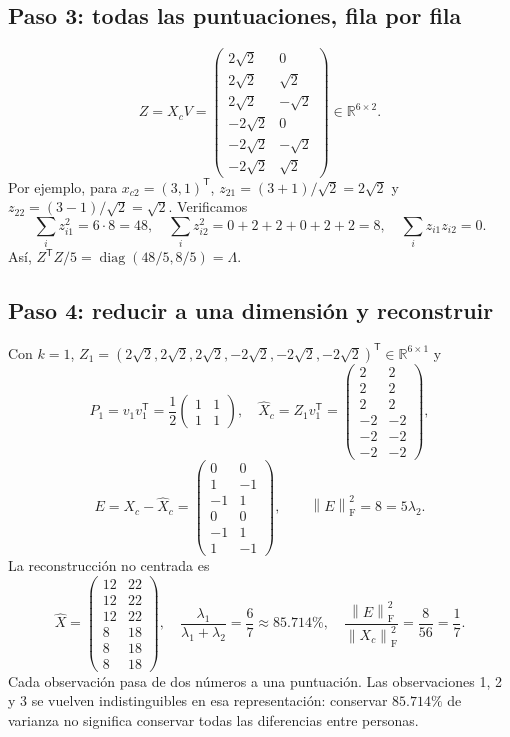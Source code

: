 \documentclass[11pt,a4paper]{article}
\newcommand{\R}{\mathbb R}
\newcommand{\T}{^{\mathsf T}}
\newcommand{\norm}[1]{\left\lVert #1\right\rVert}
\DeclareMathOperator{\diag}{diag}
\newcommand{\F}{_{\mathrm F}}
\theoremstyle{definition}
\begin{document}
\subsection{Paso 3: todas las puntuaciones, fila por fila}
\[
Z=X_cV=\begin{pmatrix}2\sqrt2&0\\2\sqrt2&\sqrt2\\2\sqrt2&-\sqrt2\\-2\sqrt2&0\\-2\sqrt2&-\sqrt2\\-2\sqrt2&\sqrt2\end{pmatrix}\in\R^{6\times2}.
\]
Por ejemplo, para $x_{c2}=(3,1)\T$, $z_{21}=(3+1)/\sqrt2=2\sqrt2$ y $z_{22}=(3-1)/\sqrt2=\sqrt2$. Verificamos
\[
\sum_i z_{i1}^2=6\cdot8=48,\quad \sum_i z_{i2}^2=0+2+2+0+2+2=8,\quad
\sum_i z_{i1}z_{i2}=0.
\]
Así, $Z\T Z/5=\diag(48/5,8/5)=\Lambda$.
\subsection{Paso 4: reducir a una dimensión y reconstruir}
Con $k=1$, $Z_1=(2\sqrt2,2\sqrt2,2\sqrt2,-2\sqrt2,-2\sqrt2,-2\sqrt2)\T\in\R^{6\times1}$ y
\[
P_1=v_1v_1\T=\frac12\begin{pmatrix}1&1\\1&1\end{pmatrix},\quad
\widehat X_c=Z_1v_1\T=\begin{pmatrix}2&2\\2&2\\2&2\\-2&-2\\-2&-2\\-2&-2\end{pmatrix},
\]
\[
E=X_c-\widehat X_c=\begin{pmatrix}0&0\\1&-1\\-1&1\\0&0\\-1&1\\1&-1\end{pmatrix},\qquad
\norm E\F^2=8=5\lambda_2.
\]
La reconstrucción no centrada es
\[
\widehat X=\begin{pmatrix}12&22\\12&22\\12&22\\8&18\\8&18\\8&18\end{pmatrix},\quad
\frac{\lambda_1}{\lambda_1+\lambda_2}=\frac67\approx85.714\%,\quad
\frac{\norm E\F^2}{\norm{X_c}\F^2}=\frac8{56}=\frac17.
\]
Cada observación pasa de dos números a una puntuación. Las observaciones 1, 2 y 3 se vuelven indistinguibles en esa representación: conservar $85.714\%$ de varianza no significa conservar todas las diferencias entre personas.
\end{document}
